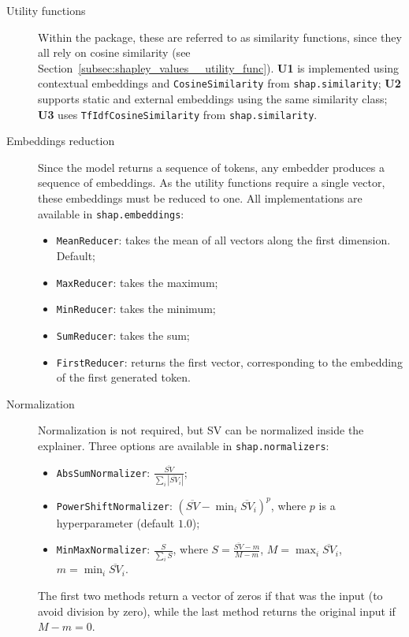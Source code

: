 \begin{appendices}
\begin{description}
    \item[Utility functions] Within the package, these are referred to as similarity functions, since they all rely on cosine similarity (see Section~\ref{subsec:shapley_values__utility_func}). \textbf{U1} is implemented using contextual embeddings and \texttt{CosineSimilarity} from \texttt{shap.similarity}; \textbf{U2} supports static and external embeddings using the same similarity class; \textbf{U3} uses \texttt{TfIdfCosineSimilarity} from \texttt{shap.similarity}.

    \item[Embeddings reduction] Since the model returns a sequence of tokens, any embedder produces a sequence of embeddings. As the utility functions require a single vector, these embeddings must be reduced to one. All implementations are available in \texttt{shap.embeddings}:
        \begin{itemize}
            \item \texttt{MeanReducer}: takes the mean of all vectors along the first dimension. Default;
            \item \texttt{MaxReducer}: takes the maximum;
            \item \texttt{MinReducer}: takes the minimum;
            \item \texttt{SumReducer}: takes the sum;
            \item \texttt{FirstReducer}: returns the first vector, corresponding to the embedding of the first generated token.
        \end{itemize}

    \item[Normalization] Normalization is not required, but SV can be normalized inside the explainer. Three options are available in \texttt{shap.normalizers}:
        \begin{itemize}
            \item \texttt{AbsSumNormalizer}: $\frac{\overline{SV}}{\sum_i |\overline{SV}_i|}$;
            \item \texttt{PowerShiftNormalizer}: $(\overline{SV} - \min_i \overline{SV}_i)^p$, where $p$ is a hyperparameter (default $1.0$);
            \item \texttt{MinMaxNormalizer}: $\frac{S}{\sum_i S}$, where $S = \frac{\overline{SV} - m}{M - m}$, $M = \max_i \overline{SV}_i$, $m = \min_i \overline{SV}_i$.
        \end{itemize}
    The first two methods return a vector of zeros if that was the input (to avoid division by zero), while the last method returns the original input if $M - m = 0$.


\end{description}
\end{appendices}
